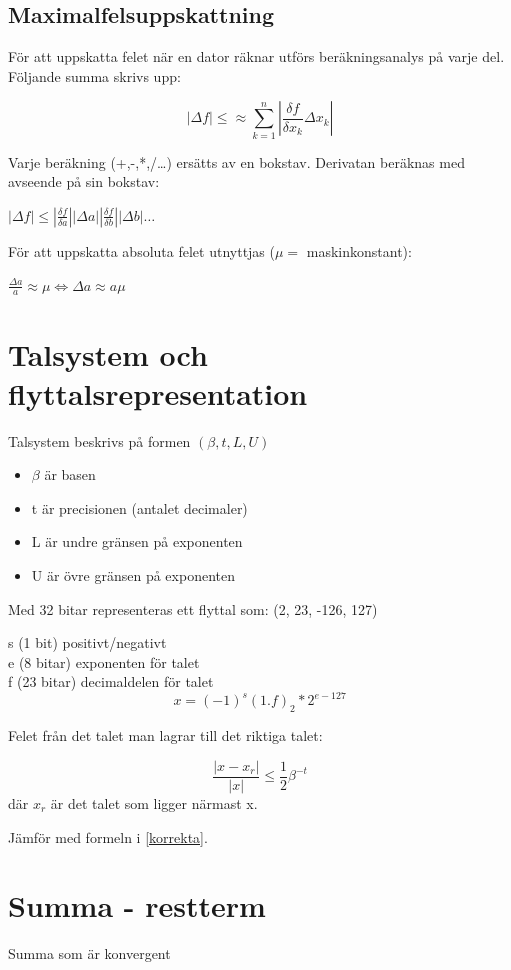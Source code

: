 \documentclass[12pt,a4paper]{article}
\begin{document}
\newpage
\subsection{Maximalfelsuppskattning}
För att uppskatta felet när en dator räknar utförs beräkningsanalys på varje del.
Följande summa skrivs upp:

$$ | \Delta f| \leq \approx \sum_{k=1}^{n} | \frac{\delta f}{\delta x_k} \Delta x_k| $$

Varje beräkning (+,-,*,/\ldots) ersätts av en bokstav.
Derivatan beräknas med avseende på sin bokstav:

$|\Delta f| \leq |\frac{\delta f}{\delta a}| |\Delta a|
|\frac{\delta f}{\delta b}| |\Delta b| \ldots$

För att uppskatta absoluta felet utnyttjas ($\mu =$ maskinkonstant):

$ \frac{\Delta a}{a} \approx \mu \Leftrightarrow \Delta a \approx a\mu$



\section{Talsystem och flyttalsrepresentation}
Talsystem beskrivs på formen $(\beta, t, L, U)$
\begin{itemize}
	\item{$\beta$ är basen}
	\item{t är precisionen (antalet decimaler)}
	\item{L är undre gränsen på exponenten}
	\item{U är övre gränsen på exponenten}
\end{itemize}

Med 32 bitar representeras ett flyttal som:
(2, 23, -126, 127)

s (1 bit) positivt/negativt \\
e (8 bitar) exponenten för talet \\
f (23 bitar) decimaldelen för talet \\
\Large
$$ x = (-1)^s(1.f)_2*2^{e-127} $$
\large

Felet från det talet man lagrar till det riktiga talet:

\Large
$$ \frac{|x-x_r|}{|x|} \leq \frac{1}{2}\beta^{-t}$$
\large
där $x_r$ är det talet som ligger närmast x.

Jämför med formeln i \ref{korrekta}.

\section{Summa - restterm}
Summa som är konvergent
\end{document}
